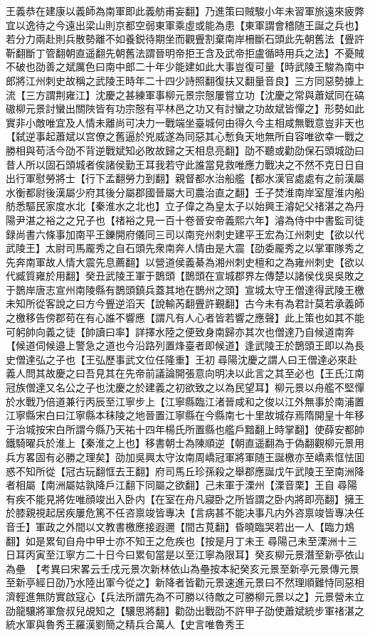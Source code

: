 王義恭在建康以義師為南軍即此義舫甫妄翻】乃進策曰賊駿小年未習軍旅遠來疲弊宜以逸待之今遠出梁山則京都空弱東軍乘虛或能為患【東軍謂會稽随王誕之兵也】若分力兩赴則兵散勢離不如養鋭待期坐而觀舋割棄南岸柵斷石頭此先朝舊法【舋許靳翻斷丁管翻朝直遥翻先朝舊法謂晉明帝拒王含及武帝拒盧循時用兵之法】不憂賊不破也劭善之斌厲色曰南中郎二十年少能建如此大事豈復可量【時武陵王駿為南中郎將江州刺史故稱之武陵王時年二十四少詩照翻復扶又翻量音良】三方同惡勢據上流【三方謂荆雍江】沈慶之甚練軍事柳元景宗慤屢嘗立功【沈慶之常與蕭斌同在碻磝柳元景討蠻出關陜皆有功宗慤有平林邑之功又有討蠻之功故斌皆憚之】形勢如此實非小敵唯宜及人情未離尚可决力一戰端坐臺城何由得久今主相咸無戰意豈非天也【弑逆事起蕭斌以宫僚之舊逼於兇威遂為同惡其心慙負天地無所自容唯欲幸一戰之勝相與苟活今劭不背逆戰斌知必敗故歸之天相息亮翻】劭不聽或勸劭保石頭城劭曰昔人所以固石頭城者俟諸侯勤王耳我若守此誰當見救唯應力戰决之不然不克日日自出行軍慰勞將士【行下孟翻勞力到翻】親督都水治船艦【都水漢官處處有之前漢屬水衡都尉後漢屬少府其後分屬郡國晉屬大司農治直之翻】壬子焚淮南岸室屋淮内船舫悉驅民家度水北【秦淮水之北也】立子偉之為皇太子以始興王濬妃父禇湛之為丹陽尹湛之裕之之兄子也【禇裕之見一百十卷晉安帝義熙六年】濬為侍中中書監司徒録尚書六條事加南平王鑠開府儀同三司以南兖州刺史建平王宏為江州刺史【欲以代武陵王】太尉司馬龎秀之自石頭先衆南奔人情由是大震【劭委龎秀之以掌軍隊秀之先奔南軍故人情大震先息薦翻】以營道侯義綦為湘州刺史檀和之為雍州刺史【欲以代臧質雍於用翻】癸丑武陵王軍于鵲頭【鵲頭在宣城郡界左傳楚以諸侯伐吳吳敗之于鵲岸唐志宣州南陵縣有鵲頭鎮兵蓋其地在鵲州之頭】宣城太守王僧達得武陵王檄未知所從客說之曰方今舋逆滔天【說輸芮翻舋許覲翻】古今未有為君計莫若承義師之檄移告傍郡苟在有心誰不響應【謂凡有人心者皆若響之應聲】此上策也如其不能可躬帥向義之徒【帥讀曰率】詳擇水陸之便致身南歸亦其次也僧達乃自候道南奔【候道伺候邉上警急之道也今沿路列置烽臺者即候道】逢武陵王於鵲頭王即以為長史僧達弘之子也【王弘歷事武文位任隆重】王初尋陽沈慶之謂人曰王僧達必來赴義人問其故慶之曰吾見其在先帝前議論開張意向明决以此言之其至必也【王氏江南冠族僧達又名公之子也沈慶之於建義之初欲致之以為民望耳】柳元景以舟艦不堅憚於水戰乃倍道兼行丙辰至江寧步上【江寧縣臨江渚晉咸和之俊以江外無事於南浦置江寧縣宋白曰江寧縣本秣陵之地晉置江寧縣在今縣南七十里故城存焉隋開皇十年移于治城按宋白所謂今縣乃天祐十四年楊氏所置縣也艦戶黯翻上時掌翻】使薛安都帥鐵騎曜兵於淮上【秦淮之上也】移書朝士為陳順逆【朝直遥翻為于偽翻觀柳元景用兵方畧固有必勝之理矣】劭加吳興太守汝南周嶠冠軍將軍随王誕檄亦至嶠素恇怯囬惑不知所從【冠古玩翻恇去王翻】府司馬丘珍孫殺之舉郡應誕戊午武陵王至南洲降者相屬【南洲屬姑孰降戶江翻下同屬之欲翻】己未軍于溧州【溧音栗】王自尋陽有疾不能見將佐唯顔竣出入卧内【在室在舟凡寢卧之所皆謂之卧内將即亮翻】擁王於膝親視起居疾屢危篤不任咨禀竣皆專决【言病甚不能决事凡内外咨禀竣皆專决任音壬】軍政之外間以文教書檄應接遐邇【間古莧翻】昏曉臨哭若出一人【臨力鴆翻】如是累旬自舟中甲士亦不知王之危疾也【按是月丁未王尋陽己未至溧洲十三日耳丙寅至江寧方二十日今曰累旬當是以至江寧為限耳】癸亥柳元景潛至新亭依山為壘　【考異曰宋畧云壬戌元景次新林依山為壘按本紀癸亥元景至新亭元景傳元景至新亭經日劭乃水陸出軍今從之】新降者皆勸元景速進元景曰不然理順難恃同惡相濟輕進無防實啟寇心【兵法所謂先為不可勝以待敵之可勝柳元景以之】元景營未立劭龍驤將軍詹叔兒覘知之【驤思將翻】勸劭出戰劭不許甲子劭使蕭斌統步軍禇湛之統水軍與魯秀王羅漢劉簡之精兵合萬人【史言唯魯秀王